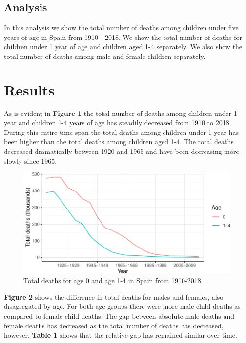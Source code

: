 \documentclass[]{article}
\begin{document}
\subsection{Analysis}\label{analysis}

In this analysis we show the total number of deaths among children under
five years of age in Spain from 1910 - 2018. We show the total number of
deaths for children under 1 year of age and children aged 1-4
separately. We also show the total number of deaths among male and
female children separately.

\section{Results}\label{results}

As is evident in \textbf{Figure 1} the total number of deaths among
children under 1 year and children 1-4 years of age has steadily
decreased from 1910 to 2018. During this entire time span the total
deaths among children under 1 year has been higher than the total deaths
among children aged 1-4. The total deaths decreased dramatically between
1920 and 1965 and have been decreasing more slowly since 1965.

\begin{figure}
\centering
\includegraphics{dcoomes_hw_10_files/figure-latex/ageall-1.pdf}
\caption{Total deaths for age 0 and age 1-4 in Spain from 1910-2018}
\end{figure}

\textbf{Figure 2} shows the difference in total deaths for males and
females, also disagregated by age. For both age groups there were more
male child deaths as compared to female child deaths. The gap between
absolute male deaths and female deaths has decreased as the total number
of deaths has decreased, however, \textbf{Table 1} shows that the
relative gap has remained similar over time.
\end{document}
